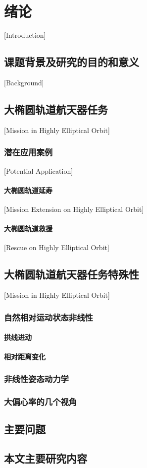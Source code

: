 
\chapter[绪论]{绪论}[Introduction]

\section{课题背景及研究的目的和意义}[Background]

\section{大椭圆轨道航天器任务}[Mission in Highly Elliptical Orbit]

\subsection{潜在应用案例}[Potential Application]

\subsubsection{大椭圆轨道延寿}[Mission Extension on Highly Elliptical Orbit]

\subsubsection{大椭圆轨道救援}[Rescue on Highly Elliptical Orbit]

\section{大椭圆轨道航天器任务特殊性}[Mission in Highly Elliptical Orbit]
\subsection{自然相对运动状态非线性}
\subsubsection{拱线进动}
\subsubsection{相对距离变化}
\subsection{非线性姿态动力学}
\subsection{大偏心率的几个视角}
\section{主要问题}

\section{本文主要研究内容}

